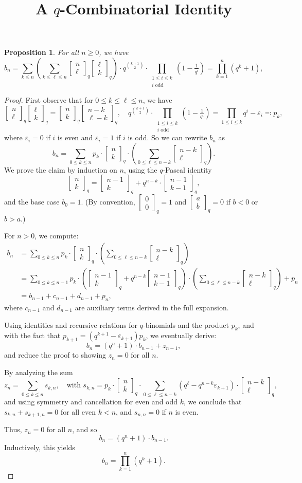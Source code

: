 \documentclass[12pt]{article}
\title{A $q$-Combinatorial Identity}
\author{}
\date{}
\newtheorem{Proposition}{Proposition}
\newcommand{\qbinom}[2]{\left[ \begin{smallmatrix} #1 \\ #2 \end{smallmatrix} \right]_q}
\begin{document}
	
	\maketitle
	
	\begin{Proposition} \label{prop:qcombinatorics}
		For all $n \geq 0$, we have
		\[
		b_n = \sum_{k \leq n} \left( \sum_{k \leq \ell \leq n} \qbinom{n}{\ell} \qbinom{\ell}{k} \right) \cdot q^{\binom{k+1}{2}} \cdot \prod_{\substack{1 \leq i \leq k\\i \text{ odd}}} \left( 1 - \tfrac{1}{q^i} \right) = \prod_{k=1}^n (q^k+1) ,
		\]
	\end{Proposition}
	
	\begin{proof}
		First observe that for $0 \leq k \leq \ell \leq n$, we have
		\[
		\qbinom{n}{\ell} \qbinom{\ell}{k} = \qbinom{n}{k} \qbinom{n-k}{\ell-k}, \quad
		q^{\binom{k+1}{2}} \cdot \prod_{\substack{1 \leq i \leq k\\i \text{ odd}}} \left( 1 - \tfrac{1}{q^i} \right) = \prod_{1 \leq i \leq k} q^i - \varepsilon_i \eqqcolon p_k ,
		\]
		where $\varepsilon_i = 0$ if $i$ is even and $\varepsilon_i = 1$ if $i$ is odd. So we can rewrite $b_n$ as
		\[
		b_n = \sum_{0 \leq k \leq n} p_k \cdot \qbinom{n}{k} \cdot \left( \sum_{0 \leq \ell \leq n-k} \qbinom{n-k}{\ell} \right) .
		\]
		We prove the claim by induction on $n$, using the $q$-Pascal identity
		\[
		\qbinom{n}{k} = \qbinom{n-1}{k} + q^{n-k} \cdot \qbinom{n-1}{k-1},
		\]
		and the base case $b_0 = 1$. (By convention, $\qbinom{0}{0} = 1$ and $\qbinom{a}{b} = 0$ if $b < 0$ or $b > a$.)
		
		For $n > 0$, we compute:
		\begin{align*}
			b_n &= \sum_{0 \leq k \leq n} p_k \cdot \qbinom{n}{k} \cdot \left( \sum_{0 \leq \ell \leq n-k} \qbinom{n-k}{\ell} \right) \\
			&= \sum_{0 \leq k \leq n-1} p_k \cdot \left( \qbinom{n-1}{k} + q^{n-k} \qbinom{n-1}{k-1} \right) \cdot \left( \sum_{0 \leq \ell \leq n-k} \qbinom{n-k}{\ell} \right) + p_n \\
			&= b_{n-1} + c_{n-1} + d_{n-1} + p_n ,
		\end{align*}
		where $c_{n-1}$ and $d_{n-1}$ are auxiliary terms derived in the full expansion.
		
		Using identities and recursive relations for $q$-binomials and the product $p_k$, and with the fact that $p_{k+1} = (q^{k+1} - \varepsilon_{k+1}) p_k$, we eventually derive:
		\[
		b_n = (q^n + 1) \cdot b_{n-1} + z_{n-1},
		\]
		and reduce the proof to showing $z_n = 0$ for all $n$.
		
		By analyzing the sum
		\[
		z_n = \sum_{0 \leq k \leq n} s_{k,n}, \quad \text{with } s_{k,n} = p_k \cdot \qbinom{n}{k} \cdot \sum_{0 \leq \ell \leq n-k} \left( q^\ell - q^{n-k} \varepsilon_{k+1} \right) \cdot \qbinom{n-k}{\ell} ,
		\]
		and using symmetry and cancellation for even and odd $k$, we conclude that $s_{k,n} + s_{k+1,n} = 0$ for all even $k < n$, and $s_{n,n} = 0$ if $n$ is even.
		
		Thus, $z_n = 0$ for all $n$, and so
		\[
		b_n = (q^n+1) \cdot b_{n-1}.
		\]
		Inductively, this yields
		\[
		b_n = \prod_{k=1}^n (q^k + 1).
		\]
	\end{proof}
	
\end{document}
